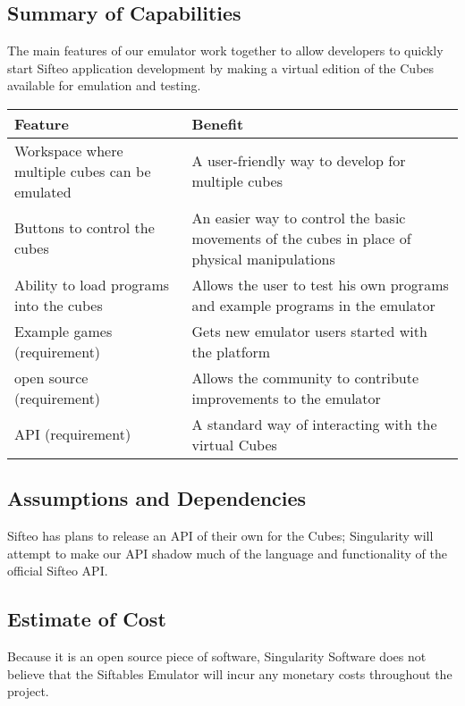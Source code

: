 \documentclass[12pt]{article}
\begin{document}
              \subsection{Summary of Capabilities}
              The main features of our emulator work together to allow developers to quickly start Sifteo application development by making a virtual edition of the Cubes available for emulation and testing.
              \begin{table}[h]
                \begin{tabular}{p{3in} | p{3in}}
                  \textbf{Feature} & \textbf{Benefit} \\ \hline
                  Workspace where multiple cubes can be emulated
                            & A user-friendly way to develop for multiple cubes \\ \hline
                  Buttons to control the cubes
                            & An easier way to control the basic movements of the cubes in place of physical manipulations \\ \hline
                  Ability to load programs into the cubes
                            & Allows the user to test his own programs and example programs in the emulator \\ \hline
                  Example games (requirement)
                            & Gets new emulator\index{emulator} users started with the platform \\ \hline
                  \Gls{open source}\index{open source}  (requirement)
                            & Allows the community to contribute improvements to the emulator\index{emulator} \\ \hline
                  \gls{API}\index{API} (requirement)
                            & A standard way of interacting with the virtual Cubes
                \end{tabular}
              \end{table}

              \subsection{Assumptions and Dependencies}
              Sifteo has plans to release an \gls{API} of their own for the Cubes; Singularity will attempt to make our \gls{API} shadow much of the language and functionality of the official Sifteo \gls{API}. 

              \subsection{Estimate of Cost}
			  Because it is an \gls{open source} piece of software, Singularity Software does not believe that the Siftables Emulator will incur any monetary costs throughout the project.
\clearpage
\end{document}
